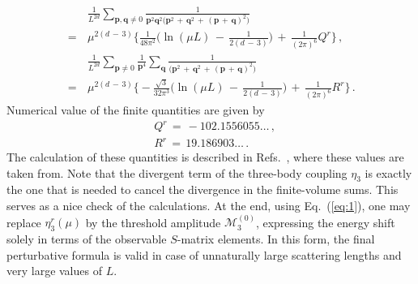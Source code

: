 \documentclass[12pt,prd,tightenlines,nofootinbib]{revtex4-2}
\begin{document}
\begin{align}
  &\frac{1}{L^{2d}}\sum_{\textbf{p},\textbf{q} \neq 0}\frac{1}{\textbf{p}^{2}\textbf{q}^{2}\big(\textbf{p}^{2}\,+\,\textbf{q}^{2}\,+\,(\textbf{p}\,+\,\textbf{q})^{2}\big)}\nonumber\\[2mm]
  \,=\,& \mu^{2(d\,-\,3)}\Big\{ \frac{1}{48\pi^{2}}\Big( \ln{(\mu L)}\,-\,\frac{1}{2(d\,-\,3)} \Big)\,+\,\frac{1}{(2\pi)^{6}}Q^{r} \Big\}\,,\\[2mm]
  &\frac{1}{L^{2d}}\sum_{\textbf{p} \neq 0}\frac{1}{\textbf{p}^{4}}\sum_{\textbf{q}}\frac{1}{\big(\textbf{p}^{2}\,+\,\textbf{q}^{2}\,+\,(\textbf{p}\,+\,\textbf{q})^{2}\big)}\nonumber\\[2mm]
  \,=\,& \mu^{2(d\,-\,3)}\Big\{ -\frac{\sqrt{3}}{32\pi^{3}}\Big( \ln{(\mu L)}\,-\,\frac{1}{2(d\,-\,3)} \Big)\,+\,\frac{1}{(2\pi)^{6}}R^{r} \Big\}\,.
\end{align}
Numerical value of the finite quantities are given by
\begin{align}
    &Q^{r}\,=\, -102.1556055\dotsc\,,\nonumber\\[2mm]
    &R^{r}\,=\, 19.186903\dotsc\,.
\end{align}
The calculation of these quantities is described in Refs.~\cite{Romero-Lopez:2020rdq,Muller:2020vtt,Beane:2007qr}, where these values are taken from. Note that the
divergent term of the three-body coupling $\eta_3$ is exactly the one that is needed to cancel the divergence in the finite-volume sums. This serves as a nice check of the
calculations. At the end, using Eq.~(\ref{eq:1}), one may replace $\eta_3^r(\mu)$ by the
threshold amplitude $\mathscr{M}_3^{(0)}$, expressing the energy shift solely in terms
of the observable $S$-matrix elements. In this form, the final perturbative
formula is valid in case
of unnaturally large scattering lengths and very large values of $L$.
\end{document}
